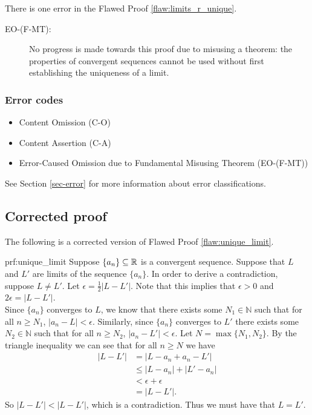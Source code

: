  \bigskip
 
 There is one error
 in the Flawed Proof \ref{flaw:limits_r_unique}. %


 \begin{description}
 	\item[EO-(F-MT): ] No progress is made towards this proof due to misusing a theorem: the properties of convergent sequences cannot be used without first establishing the uniqueness of a limit.
 \end{description}

 \bigskip

\subsubsection{Error codes}
\begin{itemize}
    \item Content Omission (C-O)
    \item Content Assertion (C-A)
    \item Error-Caused Omission due to Fundamental Misusing Theorem (EO-(F-MT))
\end{itemize}
See Section \ref{sec-error} for more information about error classifications.

\clearpage
\subsection{Corrected proof}

The following is a corrected version of Flawed Proof \ref{flaw:unique_limit}.

\begin{prf}{prf:unique_limit}
Suppose $\{a_n\}\subseteq \mathbb R$ is a convergent sequence.   Suppose that $L$ and $L'$ are limits of the sequence $\{a_n\}$.  In order to derive a contradiction, suppose $L \neq L'$. Let $\epsilon = \frac{1}{2}|L - L'|$. Note that this implies that $\epsilon>0$ and $2 \epsilon  = |L - L'|$. \\

Since $\{a_n\}$ converges to $L$, we know that there exists some $N_1 \in \mathbb{N}$ such that for all $n \geq N_1$, $|a_n - L| < \epsilon$. Similarly, since $\{a_n\}$ converges to $L'$ there exists some $N_2 \in \mathbb{N}$ such that for all $n \geq N_2$, $|a_n - L'| < \epsilon$. Let $N = \max\{N_1, N_2\}$.  By the triangle inequality we can see that for all $n \geq N$ we have
\begin{align*}
    |L - L'| &= |L - a_n + a_n - L'|\\
    &\leq |L - a_n| + |L' - a_n|\\
    &< \epsilon + \epsilon \\
    &= |L-L'|.
\end{align*}
So $|L-L'| < |L-L'|$, which is a contradiction. Thus we must have that $L = L'$.
\end{prf} 